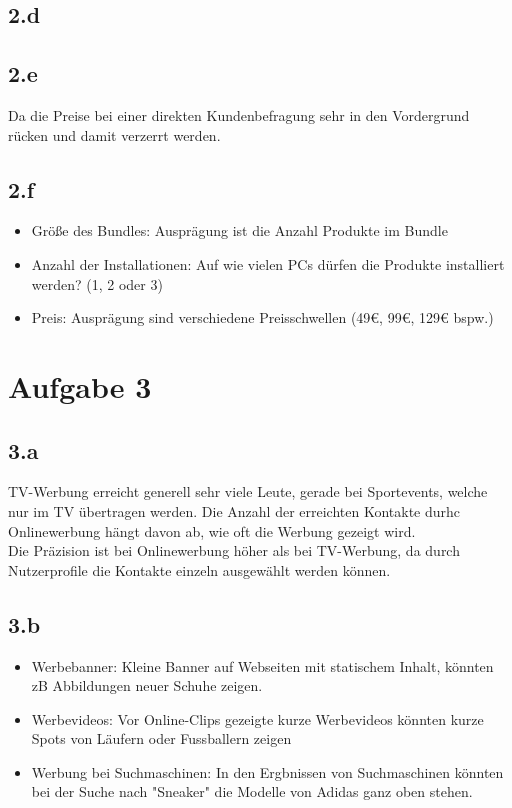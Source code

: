 \subsection{2.d}

\subsection{2.e}
    Da die Preise bei einer direkten Kundenbefragung sehr in den Vordergrund rücken und damit verzerrt werden. \\

\subsection{2.f}
    \begin{itemize}
        \item Größe des Bundles: Ausprägung ist die Anzahl Produkte im Bundle
        \item Anzahl der Installationen: Auf wie vielen PCs dürfen die Produkte installiert werden? (1, 2 oder 3)
        \item Preis: Ausprägung sind verschiedene Preisschwellen (49€, 99€, 129€ bspw.)
    \end{itemize}



\section{Aufgabe 3}
\subsection{3.a}
    TV-Werbung erreicht generell sehr viele Leute, gerade bei Sportevents, welche nur im TV übertragen werden. Die Anzahl der erreichten Kontakte durhc Onlinewerbung hängt davon ab, wie oft die Werbung gezeigt wird. \\
    Die Präzision ist bei Onlinewerbung höher als bei TV-Werbung, da durch Nutzerprofile die Kontakte einzeln ausgewählt werden können.

\subsection{3.b}
    \begin{itemize}
        \item Werbebanner: Kleine Banner auf Webseiten mit statischem Inhalt, könnten zB Abbildungen neuer Schuhe zeigen.
        \item Werbevideos: Vor Online-Clips gezeigte kurze Werbevideos könnten kurze Spots von Läufern oder Fussballern zeigen
        \item Werbung bei Suchmaschinen: In den Ergbnissen von Suchmaschinen könnten bei der Suche nach "Sneaker" die Modelle von Adidas ganz oben stehen. 
    \end{itemize}

